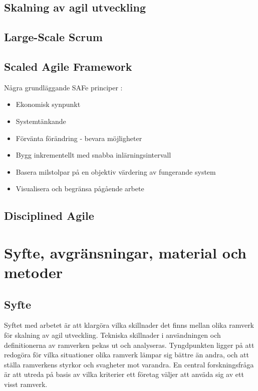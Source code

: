 \subsection{Skalning av agil utveckling}



\subsection{Large-Scale Scrum}


\subsection{Scaled Agile Framework}



Några grundläggande SAFe principer \cite{safe_principles}:
\begin{itemize}
\item Ekonomisk synpunkt
\item Systemtänkande
\item Förvänta förändring - bevara möjligheter
\item Bygg inkrementellt med snabba inlärningsintervall
\item Basera milstolpar på en objektiv värdering av fungerande system
\item Visualisera och begränsa pågående arbete
\end{itemize}


\subsection{Disciplined Agile}


	
\newpage

\section{Syfte, avgränsningar, material och metoder}


\subsection{Syfte}

Syftet med arbetet är att klargöra vilka skillnader det finns mellan olika ramverk för skalning av agil utveckling. Tekniska skillnader i användningen och definitionerna av ramverken pekas ut och analyseras.
Tyngdpunkten ligger på att redogöra för vilka situationer olika ramverk lämpar sig bättre än andra, och att ställa ramverkens styrkor och svagheter mot varandra. \newline
En central forskningsfråga är att utreda på basis av vilka kriterier ett företag väljer att anväda sig av ett visst ramverk.




